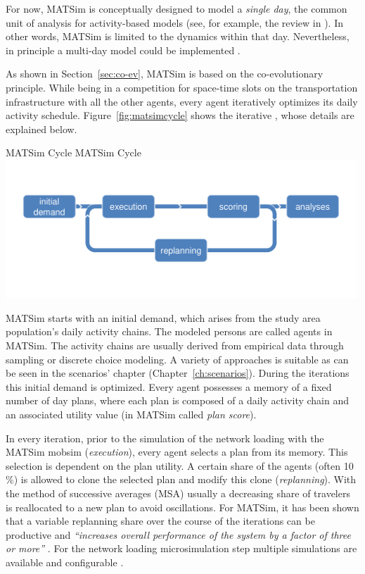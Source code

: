 For now, MATSim is conceptually designed to model a \emph{single day}, the common unit of analysis for activity-based models (see, for example, the review in \citet[][]{Bowman_TEC_2009_1}). In other words, MATSim is limited to the dynamics within that day. Nevertheless, in principle a multi-day model could be implemented \citep[][]{HorniEtAl_TechRep_IVT_2012_a}.

As shown in Section~\ref{sec:co-ev}, MATSim is based on the co-evolutionary principle. While being in a competition for space-time slots on the transportation infrastructure with all the other agents, every agent iteratively optimizes its daily \gls{activity} schedule. Figure~\ref{fig:matsimcycle} shows the iterative , whose details are explained below. 

\createfigure%
{MATSim Cycle}%
{MATSim Cycle}%
{\label{fig:matsimcycle}}%
{\includegraphics[width=0.99\textwidth, angle=0]{figures/matsimcycle.pdf}}%
{}

MATSim starts with an initial demand, which arises from the \gls{study} area population's daily activity chains. The modeled persons are called agents in MATSim. The activity chains are usually derived from empirical data through sampling or discrete choice modeling. A variety of approaches is suitable as can be seen in the scenarios' chapter (Chapter~\ref{ch:scenarios}). During the iterations this initial demand is optimized. Every agent possesses a memory of a fixed number of day plans, where each \gls{plan} is composed of a daily activity chain and an associated utility value (in MATSim called \emph{plan \gls{score}}).

In every iteration, prior to the simulation of the network loading with the MATSim \gls{mobsim} \citep[e.g.,][]{Cetin_PhDThesis_2005} (\emph{execution}), every agent selects a plan from its memory. This selection is dependent on the plan \gls{utility}. A certain share of the agents 
(often 10\,\%) is allowed to clone the selected plan and modify this clone (\emph{\gls{replanning}}). With the method of successive averages (MSA) usually a decreasing share of travelers is reallocated to a new plan to avoid oscillations. For MATSim, it has been shown that a variable replanning share over the course of the iterations can be productive and \emph{``increases overall performance of the system by a factor of three or more''} \citep[][p.7f]{CharyparEtAl_IATBR_2006}. For the network loading microsimulation step multiple simulations are available and configurable \citep[][p.10f]{HorniEtAl_TechRep_IVT_2011_a}. 

